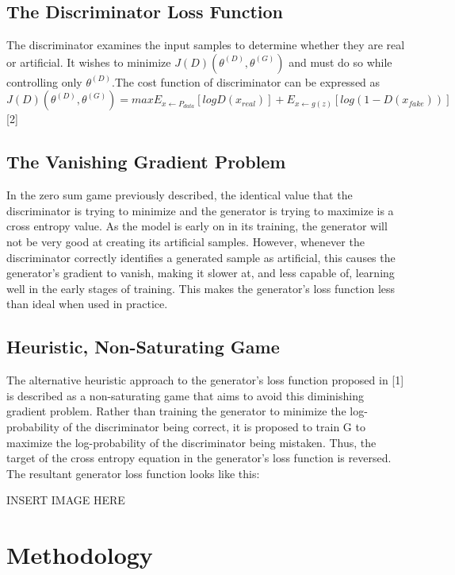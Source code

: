 \documentclass[conference]{IEEEtran}
\begin{document}
\subsection{The Discriminator Loss Function}
\indent The discriminator examines the input samples to determine whether they are real or artificial. It wishes to minimize $J(D)(\theta^{(D)},\theta^{(G)})$ and must do so while controlling only $\theta^{(D)}$.The cost function of discriminator can be expressed as\newline\newline
$J(D) (\theta^{(D)}, \theta^{(G)}) = max E_{x\leftarrow P_{data}} [log D(x_{real})] + E_{x\leftarrow g(z)} [log (1-D(x_{fake}))]$ [2]

\subsection{The Vanishing Gradient Problem}
\indent In the zero sum game previously described, the identical value that the discriminator is trying to minimize and the generator is trying to maximize is a cross entropy value. As the model is early on in its training, the generator will not be very good at creating its artificial samples. However, whenever the discriminator correctly identifies a generated sample as artificial, this causes the generator's gradient to vanish, making it slower at, and less capable of, learning well in the early stages of training. This makes the generator's loss function less than ideal when used in practice.

\subsection{Heuristic, Non-Saturating Game}
The alternative heuristic approach to the generator's loss function proposed in [1] is described as a non-saturating game that aims to avoid this diminishing gradient problem. Rather than training the generator to minimize the log-probability of the discriminator being correct, it is proposed to train G to maximize the log-probability of the discriminator being mistaken. Thus, the target of the cross entropy equation in the generator's loss function is reversed. The resultant generator loss function looks like this: 

\newline INSERT IMAGE HERE
\newline

\section{Methodology}
\end{document}

